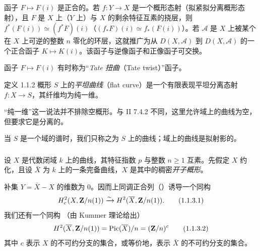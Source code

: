 函子 $F\mapsto F(i)$ 是正合的。若 $f:Y\rightarrow X$ 是一个概形态射（\resp{}拟紧拟分离概形态射），且 $F$ 是 $X$ 上（\resp $Y$ 上）与 $X$ 的剩余特征互素\pageoriginale{}的挠层，则 $f^{\ast}(F(i))\simeq(f^{\ast}F)(i)$（\resp $(f_{\ast}F)(i)\simeq f_{\ast}(F(i))$）。若 $\mathcal{A}$ 是 $X$ 上被某个在 $X$ 上可逆的整数 $n$ 零化的环层，这就推广为从 $D(X,\mathcal{A})$ 到 $D(X,\mathcal{A})$ 的一个正合函子 $K\mapsto K(i)$。该函子与逆像函子和正像函子可交换。

函子 $F\mapsto F(i)$ 有时称为“\emph{Tate 扭曲}（Tate twist）”函子。

\begin{enonce*}{定义 1.1.2}
概形 $S$ 上的\emph{平坦曲线}（flat curve）是一个有限表现平坦分离态射 $f:X\rightarrow S$，其纤维均为纯一维。
\end{enonce*}

“纯一维”这一说法并不排除空概形。与 \EGA II 7.4.2 不同，这里允许域上的曲线为空，但要求它是分离的。

当 $S$ 是一个域的谱时，我们只称之为 $S$ 上的曲线；域上的曲线是拟射影的。

\setcounter{subsubsection}{2}
\subsubsection{}
设 $X$ 是代数闭域 $k$ 上的曲线，其特征指数 $p$ 与整数 $n\geq 1$ 互素。先假定 $X$ 约化，且设 $\bar{X}$ 为 $k$ 上的一条完备曲线，$X$ 是其中的稠密\emph{开子概形}。

补集 $Y=\bar{X}-X$ 的维数为 $0$。因而上同调正合列（）诱导一个同构
\begin{equation*}
H^{2}_{c}(X,\mathbf{Z}/n(1))\xrightarrow{\sim} H^{2}(\overline{X},\mathbf{Z}/n(1)){}.\tag{1.1.3.1}
\end{equation*}%
我们还有一个同构 （由 Kummer 理论给出）
\begin{equation*}
H^{2}(\overline{X},\mathbf{Z}/n(1))=\operatorname{Pic}(\overline{X})/n=(\mathbf{Z}/n)^{c}\tag{1.1.3.2}
\end{equation*}%
其中 $c$ 表示 $X$ 的不可约分支的集合，或等价地，表示 $\bar{X}$ 的不可约分支的集合。

